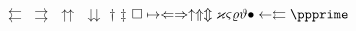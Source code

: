 
$\leftleftarrows$
$\rightrightarrows$
$\upuparrows$
$\downdownarrows$
$\dagger$
$\ddagger$
$\square\mapsto\Leftarrow\Rightarrow\uparrow\Uparrow\Updownarrow\varkappa\varsigma\varrho\vartheta\bullet\leftarrow\leftleftarrows\ppprime$